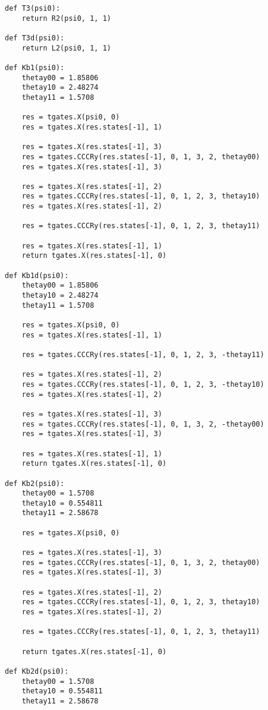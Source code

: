 \begin{verbatim}
def T3(psi0):
    return R2(psi0, 1, 1)

def T3d(psi0):
    return L2(psi0, 1, 1)

def Kb1(psi0):
    thetay00 = 1.85806
    thetay10 = 2.48274
    thetay11 = 1.5708

    res = tgates.X(psi0, 0)
    res = tgates.X(res.states[-1], 1)

    res = tgates.X(res.states[-1], 3)
    res = tgates.CCCRy(res.states[-1], 0, 1, 3, 2, thetay00)
    res = tgates.X(res.states[-1], 3)

    res = tgates.X(res.states[-1], 2)
    res = tgates.CCCRy(res.states[-1], 0, 1, 2, 3, thetay10)
    res = tgates.X(res.states[-1], 2)

    res = tgates.CCCRy(res.states[-1], 0, 1, 2, 3, thetay11)

    res = tgates.X(res.states[-1], 1)
    return tgates.X(res.states[-1], 0)

def Kb1d(psi0):
    thetay00 = 1.85806
    thetay10 = 2.48274
    thetay11 = 1.5708

    res = tgates.X(psi0, 0)
    res = tgates.X(res.states[-1], 1)

    res = tgates.CCCRy(res.states[-1], 0, 1, 2, 3, -thetay11)

    res = tgates.X(res.states[-1], 2)
    res = tgates.CCCRy(res.states[-1], 0, 1, 2, 3, -thetay10)
    res = tgates.X(res.states[-1], 2)

    res = tgates.X(res.states[-1], 3)
    res = tgates.CCCRy(res.states[-1], 0, 1, 3, 2, -thetay00)
    res = tgates.X(res.states[-1], 3)

    res = tgates.X(res.states[-1], 1)
    return tgates.X(res.states[-1], 0)

def Kb2(psi0):
    thetay00 = 1.5708
    thetay10 = 0.554811
    thetay11 = 2.58678

    res = tgates.X(psi0, 0)

    res = tgates.X(res.states[-1], 3)
    res = tgates.CCCRy(res.states[-1], 0, 1, 3, 2, thetay00)
    res = tgates.X(res.states[-1], 3)

    res = tgates.X(res.states[-1], 2)
    res = tgates.CCCRy(res.states[-1], 0, 1, 2, 3, thetay10)
    res = tgates.X(res.states[-1], 2)

    res = tgates.CCCRy(res.states[-1], 0, 1, 2, 3, thetay11)

    return tgates.X(res.states[-1], 0)

def Kb2d(psi0):
    thetay00 = 1.5708
    thetay10 = 0.554811
    thetay11 = 2.58678


\end{verbatim}
